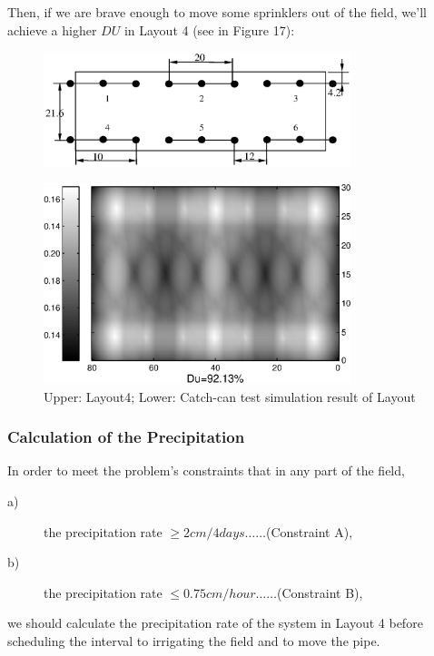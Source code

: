\documentclass[12pt,a4paper,titlepage]{article}
\begin{document}
Then, if we are brave enough to move some sprinklers out of the
field, we'll achieve a higher $DU$ in Layout 4 (see in Figure 17):
\newpage

\begin{figure}[!htb]
\centering
\includegraphics[width=0.8\textwidth]{fig171.eps}
\end{figure}

\begin{figure}[!htb]
\centering
\includegraphics[width=0.8\textwidth]{fig172.eps}
\caption{\label{fig17} Upper: Layout4; Lower: Catch-can test
simulation result of Layout }
\end{figure}

\subsubsection{Calculation of the Precipitation}

In order to meet the problem's constraints that in any part of the
field,

\begin{description}
\item[a)] the precipitation rate $\geq 2 cm/4 days\ldots\ldots$(Constraint A),

\item[b)] the precipitation rate $\leq0.75 cm/hour\ldots\ldots$(Constraint B),
\end{description}

we should calculate the precipitation rate of the system in Layout
4 before scheduling the interval to irrigating the field and to
move the pipe.
\end{document}
